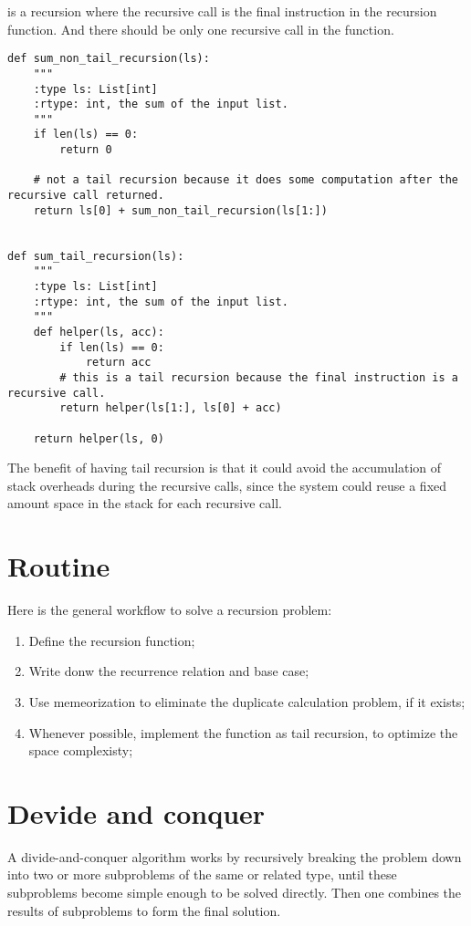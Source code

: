  is a recursion where the recursive call is the final instruction in the recursion function.
And there should be only one recursive call in the function.



\begin{lstlisting}
def sum_non_tail_recursion(ls):
    """
    :type ls: List[int]
    :rtype: int, the sum of the input list.
    """
    if len(ls) == 0:
        return 0
    
    # not a tail recursion because it does some computation after the recursive call returned.
    return ls[0] + sum_non_tail_recursion(ls[1:])


def sum_tail_recursion(ls):
    """
    :type ls: List[int]
    :rtype: int, the sum of the input list.
    """
    def helper(ls, acc):
        if len(ls) == 0:
            return acc
        # this is a tail recursion because the final instruction is a recursive call.
        return helper(ls[1:], ls[0] + acc)
    
    return helper(ls, 0)  
\end{lstlisting}


The benefit of having tail recursion is that it could avoid the accumulation of stack overheads during the recursive calls, since the system could reuse a fixed amount space in the stack for each recursive call. 


\section{Routine}

Here is the general workflow to solve a recursion problem:
\begin{enumerate}
\item Define the recursion function;
\item Write donw the recurrence relation and base case;
\item Use memeorization to eliminate the duplicate calculation problem, if it exists;
\item Whenever possible, implement the function as tail recursion, to optimize the space complexisty;
\end{enumerate}

\section{Devide and conquer}

A divide-and-conquer algorithm works by recursively breaking the problem down into two or more subproblems of the same or related type, until these subproblems become simple enough to be solved directly.
Then one combines the results of subproblems to form the final solution.

